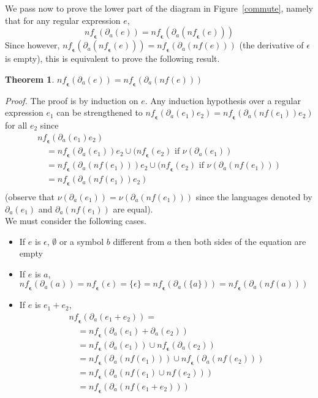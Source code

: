 \documentclass[preprint]{sigplanconf}
\newcommand{\der}[2]{\ensuremath{\partial_{#1}(#2)}}
\newcommand{\nul}[1]{\ensuremath{\nu(#1)}}
\newcommand{\dnf}{\mathit{nf}}
\newcommand{\nf}{\mathit{nf}_{\!\mathbf{\epsilon}}}
\newcounter{item}
\newtheorem{theorem}[item]{Theorem}
\newenvironment{proof}{\begin{trivlist}\item[]{\em Proof.}}{\end{trivlist}}
\begin{document}
We pass now to prove the lower part of the diagram in Figure~\ref{commute},
namely that for any regular expression $e$, 
\[\nf(\der{a}{e}) = \nf(\der{a}{\nf(e)}) \] 
Since however, 
$\nf(\der{a}{\nf(e)}) = \nf(\der{a}{\dnf(e)})$ (the derivative of $\epsilon$
is empty), this is equivalent to prove the following
result.





\begin{theorem}\label{techw}
$
\nf(\der{a}{e}) = \nf(\der{a}{\dnf(e)})
$
\end{theorem}
\begin{proof}
The proof is by induction on $e$.
Any induction hypothesis over a regular
expression $e_1$ can be strengthened to
$\nf(\der{a}{e_1} e_2) = \nf(\der{a}{\dnf(e_1)} e_2)$ for all $e_2$ since
$$\begin{array}{l}
\nf(\der{a}{e_1}e_2) \\
\quad = \nf(\der{a}{e_1})e_2 \cup (\nf(e_2) \mbox{ if } \nul{\der{a}{e_1}}\\
\quad = \nf(\der{a}{\dnf(e_1)})e_2 \cup (\nf(e_2) \mbox{ if } \nul{\der{a}{\dnf(e_1)}}\\
\quad = \nf(\der{a}{\dnf(e_1)}e_2)\\
\end{array}$$
(observe that $\nul{\der{a}{e_1}} = \nul{\der{a}{\dnf(e_1)}}$ since the languages denoted by $\der{a}{e_1}$ and $\der{a}{\dnf(e_1)}$ are equal).\\
We must consider the following cases.
\begin{itemize}
\item If $e$ is $\epsilon$, $\emptyset$ or a symbol $b$ different from
$a$ then both sides of the equation are empty
\item If $e$ is $a$,
 $\nf(\der{a}{a}) = \nf(\epsilon) = \{\epsilon\} = \nf(\der{a}{\{a\}}) =
  \nf(\der{a}{\dnf(a)})$
\item If $e$ is $e_1 + e_2$,
$$\begin{array}{l}
 \nf(\der{a}{e_1 + e_2}) =\\
\quad = \nf(\der{a}{e_1} + \der{a}{e_2})\\
\quad = \nf(\der{a}{e_1}) \cup \nf(\der{a}{e_2})\\
\quad = \nf(\der{a}{\dnf(e_1)}) \cup \nf(\der{a}{\dnf(e_2)})\\
\quad = \nf(\der{a}{\dnf(e_1) \cup \dnf(e_2)})\\
\quad = \nf(\der{a}{\dnf(e_1 + e_2)})
\end{array}$$

\end{itemize}
\end{proof}
\end{document}
